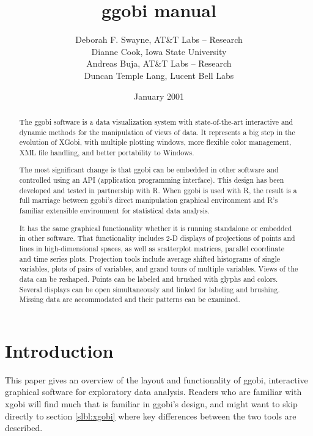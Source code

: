 \documentclass[11pt]{article}
\begin{document}
\title {ggobi manual}
\author{
Deborah F. Swayne, AT\&T Labs -- Research \\
Dianne Cook, Iowa State University \\
Andreas Buja, AT\&T Labs -- Research \\
Duncan Temple Lang, Lucent Bell Labs
}
\date{January 2001}

\maketitle


\begin{abstract}

The ggobi software is a data visualization system with state-of-the-art
interactive and dynamic methods for the manipulation of views of
data.  It represents a big step in the evolution of XGobi, with
multiple plotting windows, more flexible color management, XML file
handling, and better portability to Windows.

The most significant change is that ggobi can be embedded in other
software and controlled using an API (application programming
interface).  This design has been developed and tested in partnership
with R.  When ggobi is used with R, the result is a full marriage
between ggobi's direct manipulation graphical environment and R's
familiar extensible environment for statistical data analysis.

It has the same graphical functionality whether it is running
standalone or embedded in other software.  That functionality
includes 2-D displays of projections of points and lines in
high-dimensional spaces, as well as scatterplot matrices, parallel
coordinate and time series plots.  Projection tools include average
shifted histograms of single variables, plots of pairs of variables,
and grand tours of multiple variables.  Views of the data can be
reshaped.  Points can be labeled and brushed with glyphs and colors.
Several displays can be open simultaneously and linked for labeling
and brushing.  Missing data are accommodated and their patterns can
be examined.
\end{abstract}

\section{Introduction}

This paper gives an overview of the layout and functionality of ggobi,
interactive graphical software for exploratory data analysis.  Readers
who are familiar with xgobi will find much that is familiar in ggobi's
design, and might want to skip directly to section \ref{slbl:xgobi}
where key differences between the two tools are described.
\end{document}
